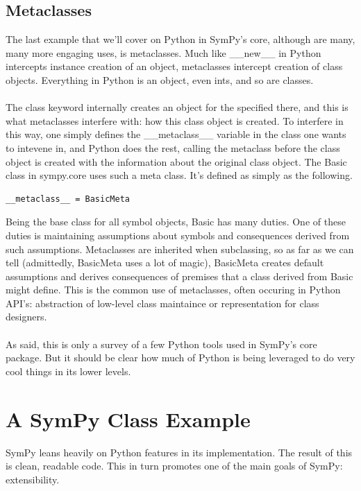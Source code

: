 \documentclass[11pt,a4paper,oneside]{report}
\begin{document}
\subsection*{Metaclasses}
The last example that we'll cover on Python in SymPy's core, although are many, many more engaging uses, is metaclasses. Much like \_\_new\_\_ in Python intercepts instance creation of an object, metaclasses intercept creation of class objects. Everything in Python is an object, even ints, and so are classes.\\\\
 The class keyword internally creates an object for the specified there, and this is what metaclasses interfere with: how this class object is created. To interfere in this way, one simply defines the \_\_metaclass\_\_ variable in the class one wants to intevene in, and Python does the rest, calling the metaclass before the class object is created with the information about the original class object. The Basic class in sympy.core uses such a meta class. It's defined as simply as the following.
\begin{verbatim}
__metaclass__ = BasicMeta
\end{verbatim}
Being the base class for all symbol objects, Basic has many duties. One of these duties is maintaining assumptions about symbols and consequences derived from such assumptions. Metaclasses are inherited when subclassing, so as far as we can tell (admittedly, BasicMeta uses a lot of magic), BasicMeta creates default assumptions and derives consequences of premises that a class derived from Basic might define. This is the common use of metaclasses, often occuring in Python API's: abstraction of low-level class maintaince or representation for class designers.\\\\
As said, this is only a survey of a few Python tools used in SymPy's core package. But it should be clear how much of Python is being leveraged to do very cool things in its lower levels.
\section*{A SymPy Class Example}
SymPy leans heavily on Python features in its implementation. The result of this is clean, readable code. This in turn promotes one of the main goals of SymPy: extensibility.
\end{document}
